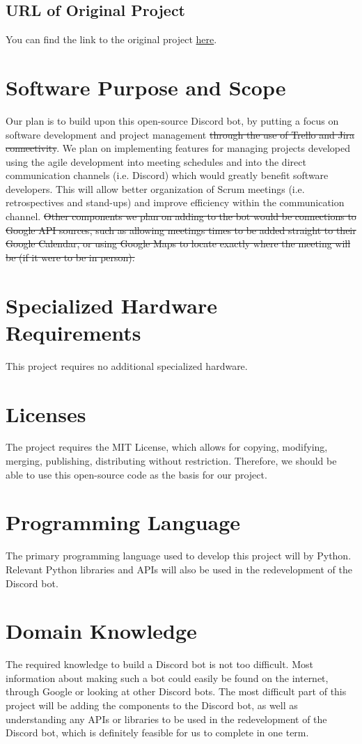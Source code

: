 \documentclass[12pt]{article}
\begin{document}
\subsection{URL of Original Project}
You can find the link to the original project \href{https://github.com/Code-Plus-Plus/discord-meeting-bot}{here}.

\section{Software Purpose and Scope}
Our plan is to build upon this open-source Discord bot, by putting a focus on software development and project management \sout{through the use of Trello and Jira connectivity}. We plan on implementing features for managing projects developed using the agile development into meeting schedules and into the direct communication channels (i.e. Discord) which would greatly benefit software developers. This will allow better organization of Scrum meetings (i.e. retrospectives and stand-ups) and improve efficiency within the communication channel. \sout{Other components we plan on adding to the bot would be connections to Google API sources, such as allowing meetings times to be added straight to their Google Calendar, or using Google Maps to locate exactly where the meeting will be (if it were to be in person).}

\section{Specialized Hardware Requirements}
This project requires no additional specialized hardware.

\section{Licenses}
The project requires the MIT License, which allows for copying, modifying, merging, publishing, distributing without restriction. Therefore, we should be able to use this open-source code as the basis for our project.

\section{Programming Language}
The primary programming language used to develop this project will by Python. Relevant Python libraries and APIs will also be used in the redevelopment of the Discord bot.

\section{Domain Knowledge}
The required knowledge to build a Discord bot is not too difficult. Most information about making such a bot could easily be found on the internet, through Google or looking at other Discord bots. The most difficult part of this project will be adding the components to the Discord bot, as well as understanding any APIs or libraries to be used in the redevelopment of the Discord bot, which is definitely feasible for us to complete in one term.
\end{document}
